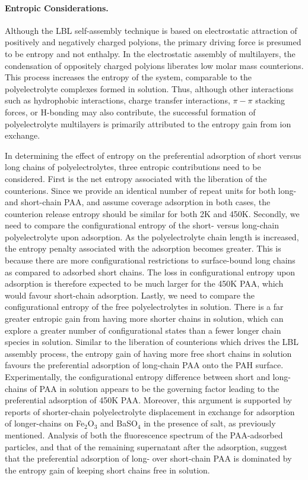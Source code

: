 \documentclass[twoside,twocolumn,9pt]{article}
\begin{document}
\paragraph{Entropic Considerations.}  %
    \label{sec-entropic}

Although the LBL self-assembly technique is based on electrostatic attraction of positively and negatively charged polyions, the primary driving force is presumed to be entropy and not enthalpy.  In the electrostatic assembly of multilayers, the condensation of oppositely charged polyions liberates low molar mass counterions.  This process increases the entropy of the system, comparable to the polyelectrolyte complexes formed in solution.\cite{Kabanov1994,Philipp1989}  Thus, although other interactions such as hydrophobic interactions, charge transfer interactions, $\pi{-}\pi$ stacking forces, or H-bonding may also contribute, the successful formation of polyelectrolyte multilayers is primarily attributed to the entropy gain from ion 
exchange.\cite{Kotov1999,Bertrand2000}  

In determining the effect of entropy on the preferential adsorption of short versus long chains of polyelectrolytes, three entropic contributions need to be considered.  First is the net entropy associated with the liberation of the counterions.  Since we provide an identical number of repeat units for both long- and short-chain PAA, and assume coverage adsorption in both cases, the counterion release entropy should be similar for both 2K and 450K.  Secondly, we need to compare the configurational entropy of the short- versus long-chain polyelectrolyte upon adsorption.  As the polyelectrolyte chain length is increased, the entropy penalty associated with the adsorption becomes greater.  This is because there are more configurational restrictions to surface-bound long chains as compared to adsorbed short chains.  The loss in configurational entropy upon adsorption is therefore expected to be much larger for the 450K PAA, which would favour short-chain adsorption.  Lastly, we need to compare the configurational entropy of the free polyelectrolytes in solution.  There is a far greater entropic gain from having more shorter chains in solution, which can explore a greater number of configurational states than a fewer longer chain species in solution.  Similar to the liberation of counterions which drives the LBL assembly process, the entropy gain of having more free short chains in solution favours the preferential adsorption of long-chain PAA onto the PAH surface.  Experimentally, the configurational entropy difference between short and long-chains of PAA in solution appears to be the governing factor leading to the preferential adsorption of 450K PAA.  Moreover, this argument is supported by reports of shorter-chain polyelectrolyte displacement in exchange for adsorption of longer-chains on Fe$_2$O$_3$ and BaSO$_4$ in the presence of salt, as previously mentioned.\cite{DeLaat1995}  Analysis of both the fluorescence spectrum of the PAA-adsorbed particles, and that of the remaining supernatant after the adsorption, suggest that the preferential adsorption of long- over short-chain PAA is dominated by the entropy gain of keeping short chains free in solution.
\end{document}
